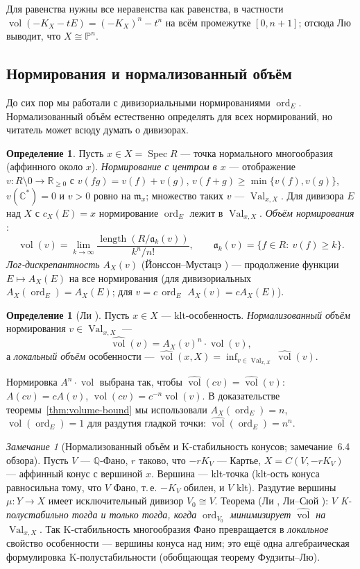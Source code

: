 \documentclass[11pt,a4paper]{article}
\theoremstyle{plain}
\theoremstyle{definition}
\newtheorem{definition}[theorem]{Определение}
\theoremstyle{remark}
\newtheorem{remark}[theorem]{Замечание}
\renewcommand{\C}{\mathbb{C}}
\newcommand{\Q}{\mathbb{Q}}
\newcommand{\R}{\mathbb{R}}
\newcommand{\PP}{\mathbb{P}}
\newcommand{\mm}{\mathfrak{m}}
\newcommand{\fa}{\mathfrak{a}}
\DeclareMathOperator{\ord}{ord}
\DeclareMathOperator{\vol}{vol}
\DeclareMathOperator{\length}{length}
\DeclareMathOperator{\Spec}{Spec}
\DeclareMathOperator{\Val}{Val}
\newcommand{\hvol}{\widehat{\vol}}
\begin{document}
Для равенства нужны все неравенства как равенства, в частности $\vol(-K_X-tE)=(-K_X)^n-t^n$ на всём
промежутке $[0,n+1]$; отсюда Лю \cite{Liu18} выводит, что $X\cong\PP^n$.

\subsection{Нормирования и нормализованный объём}

До сих пор мы работали с дивизориальными нормированиями $\ord_E$. Нормализованный объём естественно
определять для всех нормирований, но читатель может всюду думать о дивизорах.

\begin{definition}
Пусть $x\in X=\Spec R$ --- точка нормального многообразия (аффинного около $x$). \emph{Нормирование
с центром в $x$} --- отображение $v\colon R\setminus0\to\R_{\ge0}$ с $v(fg)=v(f)+v(g)$,
$v(f+g)\ge\min\{v(f),v(g)\}$, $v(\C^*)=0$ и $v>0$ ровно на $\mm_x$; множество таких $v$ ---
$\Val_{x,X}$. Для дивизора $E$ над $X$ с $c_X(E)=x$ нормирование $\ord_E$ лежит в $\Val_{x,X}$.
\emph{Объём нормирования} \cite{ELS}:
\[
\vol(v)=\lim_{k\to\infty}\frac{\length(R/\fa_k(v))}{k^n/n!},\qquad\fa_k(v)=\{f\in R:\ v(f)\ge k\} .
\]
\emph{Лог-дискрепантность} $A_X(v)$ (Йонссон--Мустацэ \cite{JM}) --- продолжение функции
$E\mapsto A_X(E)$ на все нормирования (для дивизориальных $A_X(\ord_E)=A_X(E)$; для $v=c\,\ord_E$
$A_X(v)=cA_X(E)$).
\end{definition}

\begin{definition}[{Ли \cite{Li18}}]\label{def:nvol}
Пусть $x\in X$ --- klt-особенность. \emph{Нормализованный объём} нормирования $v\in\Val_{x,X}$ ---
\[
\hvol(v)=A_X(v)^n\cdot\vol(v),
\]
а \emph{локальный объём} особенности ---
$\hvol(x,X)=\inf_{v\in\Val_{x,X}}\hvol(v)$.
\end{definition}

Нормировка $A^n\cdot\vol$ выбрана так, чтобы $\hvol(cv)=\hvol(v)$: $A(cv)=cA(v)$,
$\vol(cv)=c^{-n}\vol(v)$. В доказательстве теоремы~\ref{thm:volume-bound} мы использовали
$A_X(\ord_E)=n$, $\vol(\ord_E)=1$ для раздутия гладкой точки: $\hvol(\ord_E)=n^n$.

\begin{remark}[Нормализованный объём и K-стабильность конусов; замечание~6.4 обзора]\label{rem:cone-nvol}
Пусть $V$ --- $\Q$-Фано, $r$ таково, что $-rK_V$ --- Картье, $X=C(V,-rK_V)$ --- аффинный конус с
вершиной $x$. Вершина --- klt-точка (klt-ость конуса равносильна тому, что $V$ Фано, т.\,е. $-K_V$
обилен, и $V$ klt). Раздутие вершины $\mu\colon Y\to X$ имеет исключительный дивизор $V_0\cong V$.
Теорема (Ли \cite{Li17}, Ли--Сюй \cite{LX20}): \emph{$V$ K-полустабильно тогда и только тогда, когда
$\ord_{V_0}$ минимизирует $\hvol$ на $\Val_{x,X}$}. Так K-стабильность многообразия Фано
превращается в \emph{локальное} свойство особенности --- вершины конуса над ним; это ещё одна
алгебраическая формулировка K-полустабильности (обобщающая теорему Фудзиты--Лю).
\end{remark}
\end{document}
